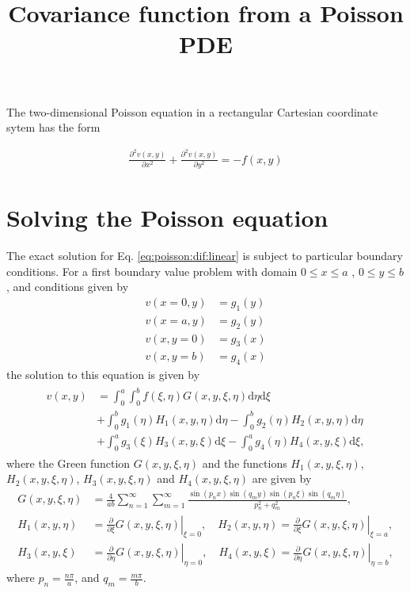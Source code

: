 \documentclass[a4paper,10pt]{article}
\title{Covariance function from a Poisson PDE}
\author{}
\date{}
\newcommand{\dif}{\textrm{d}}
\begin{document}
\maketitle

The two-dimensional Poisson equation in a rectangular Cartesian
coordinate sytem has the form

\begin{align}\label{eq:poisson:dif:linear}
\frac{\partial^2 v(x,y)}{\partial x^2} +  \frac{\partial^2
  v(x,y)}{\partial y^2} = -  f(x,y)
\end{align}

\section{Solving the Poisson equation}

The exact solution for Eq. \eqref{eq:poisson:dif:linear} is subject to
particular boundary conditions. For a first boundary value
problem with domain 
$0\leq x\leq a$ , $0\leq y\leq b$, and conditions given by
\begin{align*}
v(x=0, y) &= g_1(y)\\
v(x=a,y) &= g_2(y) \\
v(x,y=0) &= g_3(x) \\
v(x,y=b) &= g_4(x)
\end{align*}
the solution to this equation is given by \cite{Polyanin:Handbook02}
\begin{align}\label{eq:sol:poisson:dif:linear}
\begin{split}
v(x,y)&=\int_{0}^{a}\int_{0}^{b}f(\xi,\eta)G(x, y,\xi,\eta)\dif{\eta}\dif{\xi}\\
      &+ \int_0^bg_1(\eta)H_1(x, y, \eta)\dif\eta
      -\int_0^bg_2(\eta)H_2(x, y, \eta)\dif\eta \\
 &+ \int_0^ag_3(\xi)H_3(x, y, \xi)\dif\xi -\int_0^ag_4(\eta)H_4(x, y, \xi)\dif\xi,
\end{split}
\end{align}
where the Green function $G(x, y,\xi,\eta)$ and the functions $H_1(x,
y,\xi,\eta)$, $H_2(x, y,\xi,\eta)$, $H_3(x, y,\xi,\eta)$ and $H_4(x, y,\xi,\eta)$ are given by
\begin{align}\label{eq:green:function}
G(x, y,\xi,\eta)&=\frac{4}{ab}\sum_{n=1}^\infty
                  \sum_{m=1}^\infty\frac{\sin\left({p_n x}\right)
\sin\left(q_m y\right)\sin\left(p_n \xi\right)\sin\left(q_m \eta\right)}{p_n^2 + q_m^2},\\
H_1(x, y,\eta)& =
                         \left.\frac{\partial}{\partial\xi}G(x, y, \xi,\eta)\right|_{\xi=0},\quad 
H_2(x, y,\eta) = \left.\frac{\partial}{\partial\xi}G(x, y,
                    \xi,\eta)\right|_{\xi=a}\nonumber,\\
H_3(x, y,\xi)& =
                         \left.\frac{\partial}{\partial\eta}G(x, y, \xi,\eta)\right|_{\eta=0},\quad 
H_4(x, y,\xi) = \left.\frac{\partial}{\partial\eta}G(x, y, \xi,\eta)\right|_{\eta=b}\nonumber,
\end{align}
where $p_n=\frac{n\pi}{a}$, and $q_m=\frac{m\pi}{b}$.
\end{document}
